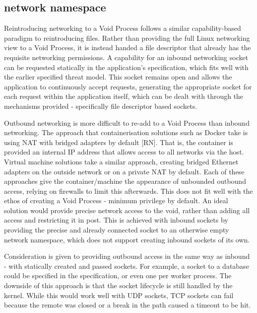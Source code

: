 \documentclass[sigplan]{acmart}
\begin{document}
\subsection{network namespace}
\label{sec:filling-net}

Reintroducing networking to a Void Process follows a similar capability-based paradigm to reintroducing files. Rather than providing the full Linux networking view to a Void Process, it is instead handed a file descriptor that already has the requisite networking permissions. A capability for an inbound networking socket can be requested statically in the application's specification, which fits well with the earlier specified threat model. This socket remains open and allows the application to continuously accept requests, generating the appropriate socket for each request within the application itself, which can be dealt with through the mechanisms provided - specifically file descriptor based sockets.

Outbound networking is more difficult to re-add to a Void Process than inbound networking. The approach that containerisation solutions such as Docker take is using NAT with bridged adapters by default [RN]. That is, the container is provided an internal IP address that allows access to all networks via the host. Virtual machine solutions take a similar approach, creating bridged Ethernet adapters on the outside network or on a private NAT by default. Each of these approaches give the container/machine the appearance of unbounded outbound access, relying on firewalls to limit this afterwards. This does not fit well with the ethos of creating a Void Process - minimum privilege by default. An ideal solution would provide precise network access to the void, rather than adding all access and restricting it in post. This is achieved with inbound sockets by providing the precise and already connected socket to an otherwise empty network namespace, which does not support creating inbound sockets of its own.

Consideration is given to providing outbound access in the same way as inbound - with statically created and passed sockets. For example, a socket to a database could be specified in the specification, or even one per worker process. The downside of this approach is that the socket lifecycle is still handled by the kernel. While this would work well with UDP sockets, TCP sockets can fail because the remote was closed or a break in the path caused a timeout to be hit.
\end{document}
